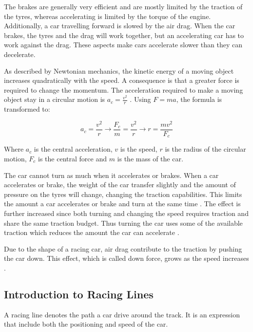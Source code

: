 The brakes are generally very efficient and are mostly limited by the traction of the tyres, whereas accelerating is limited by the torque of the engine. Additionally, a car travelling forward is slowed by the air drag. When the car brakes, the tyres and the drag will work together, but an accelerating car has to work against the drag. These aspects make cars accelerate slower than they can decelerate.

As described by Newtonian mechanics, the kinetic energy of a moving object increases quadratically with the speed. A consequence is that a greater force is required to change the momentum. The acceleration required to make a moving object stay in a circular motion is \(a_c=\frac{v^2}{r}\)  \cite{beckman}. Using \(F=ma\), the formula is transformed to: 

\begin{equation}
a_c = \frac{v^2}{r} 
\rightarrow
\frac{F_c}{m} = \frac{v^2}{r} 
\rightarrow
r = \frac{mv^2}{F_c}
\end{equation}

\noindent
Where $a_c$ is the central acceleration, $v$ is the speed, $r$ is the radius of the circular motion, $F_c$ is the central force and $m$ is the mass of the car. 

The car cannot turn as much when it accelerates or brakes. When a car accelerates or brake, the weight of the car transfer slightly and the amount of pressure on the tyres will change, changing the traction capabilities. This limits the amount a car accelerates or brake and turn at the same time \cite{beckman}. The effect is further increased since both turning and changing the speed requires traction and share the same traction budget. Thus turning the car uses some of the available traction which reduces the amount the car can accelerate \cite{beckman, edmondson}. 


Due to the shape of a racing car, air drag contribute to the traction by pushing the car down. This effect, which is called down force, grows as the speed increases \cite{beckman}.

\subsection{Introduction to Racing Lines}
A racing line denotes the path a car drive around the track. It is an expression that include both the positioning and speed of the car.

